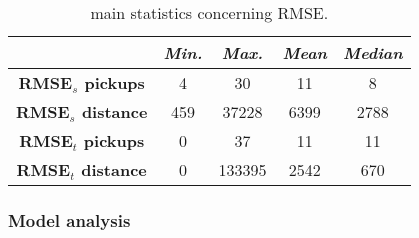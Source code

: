\begin{table}[h!]
	\centering
	\renewcommand\arraystretch{1.3}
	\begin{tabular}{c|c|c|c|c|}
		\hline
		\textit{} & \textit{Min.} & \textit{Max.} & \textit{Mean} & \textit{Median} \\
		\hline
		\textbf{RMSE$_s$ pickups} & 4 & 30 & 11 & 8 \\
		\hline
		\textbf{RMSE$_s$ distance} & 459 & 37228 & 6399 & 2788 \\
		\hline
		\textbf{RMSE$_t$ pickups} & 0 & 37 & 11 & 11 \\
		\hline
		\textbf{RMSE$_t$ distance} & 0 & 133395 & 2542 & 670\\
		\hline
	\end{tabular}
	\caption[Main statistics concerning RMSE (HDGM)]{main statistics concerning RMSE.}
	\label{RMSE_HDGM_stats}
\end{table}
\subsubsection{Model analysis} 
